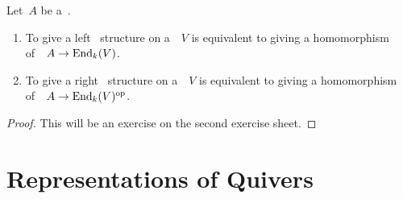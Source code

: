 \begin{proposition}
  Let~$A$ be a~{\kalg}.
  \begin{enumerate}
    \item
      To give a left~{\Amod} structure on a~{\kmod}~$V$ is equivalent to giving a homomorphism of~{\kalg}~$A \to \operatorname{End}_k(V)$.
    \item
      To give a right~{\Amod} structure on a~{\kmod}~$V$ is equivalent to giving a homomorphism of~{\kalg}~$A \to \operatorname{End}_k(V)^{\mathrm{op}}$.
  \end{enumerate}
\end{proposition}


\begin{proof}
  This will be an exercise on the second exercise sheet.
\end{proof}










\section{Representations of Quivers}


